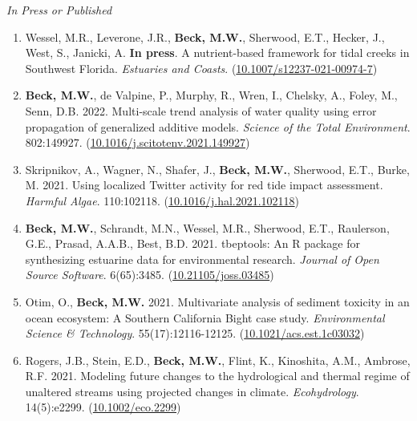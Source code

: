 \documentclass[letterpaper,12pt]{article}
\newcommand{\subsectitle}[1]{\vspace{\baselineskip} \centerline{\normalsize{\textit{#1}}}}
\begin{document}
\subsectitle{In Press or Published}

\begin{enumerate}

\item Wessel, M.R., Leverone, J.R., \textbf{Beck, M.W.}, Sherwood, E.T., Hecker, J., West, S., Janicki, A. \textbf{In press}. A nutrient-based framework for tidal creeks in Southwest Florida. \textit{Estuaries and Coasts}. ({\footnotesize\href{https://doi.org/10.1007/s12237-021-00974-7}{10.1007/s12237-021-00974-7}})

\item \textbf{Beck, M.W.}, de Valpine, P., Murphy, R., Wren, I., Chelsky, A., Foley, M., Senn, D.B. 2022. Multi-scale trend analysis of water quality using error propagation of generalized additive models. \textit{Science of the Total Environment}. 802:149927. ({\footnotesize\href{https://doi.org/10.1016/j.scitotenv.2021.149927}{10.1016/j.scitotenv.2021.149927}})

\item Skripnikov, A., Wagner, N., Shafer, J., \textbf{Beck, M.W.}, Sherwood, E.T., Burke, M. 2021. Using localized Twitter activity for red tide impact assessment. \textit{Harmful Algae}. 110:102118. ({\footnotesize\href{https://doi.org/10.1016/j.hal.2021.102118}{10.1016/j.hal.2021.102118}})

\item \textbf{Beck, M.W.}, Schrandt, M.N., Wessel, M.R., Sherwood, E.T., Raulerson, G.E., Prasad, A.A.B., Best, B.D. 2021. tbeptools: An R package for synthesizing estuarine data for environmental research. \textit{Journal of Open Source Software}. 6(65):3485. ({\footnotesize\href{https://doi.org/10.21105/joss.03485}{10.21105/joss.03485}})

\item Otim, O., \textbf{Beck, M.W.} 2021. Multivariate analysis of sediment toxicity in an ocean ecosystem: A Southern California Bight case study. \textit{Environmental Science \& Technology}. 55(17):12116-12125. ({\footnotesize\href{https://doi.org/10.1021/acs.est.1c03032}{10.1021/acs.est.1c03032}})

\item Rogers, J.B., Stein, E.D., \textbf{Beck, M.W.}, Flint, K., Kinoshita, A.M., Ambrose, R.F. 2021. Modeling future changes to the hydrological and thermal regime of unaltered streams using projected changes in climate. \textit{Ecohydrology}. 14(5):e2299. ({\footnotesize\href{https://doi.org/10.1002/eco.2299}{10.1002/eco.2299}})


\end{enumerate}
\end{document}
